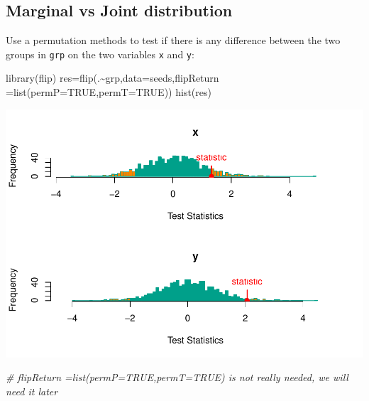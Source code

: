 \documentclass[
]{article}
\newenvironment{Shaded}{\begin{snugshade}}{\end{snugshade}}
\newcommand{\AttributeTok}[1]{\textcolor[rgb]{0.77,0.63,0.00}{#1}}
\newcommand{\CommentTok}[1]{\textcolor[rgb]{0.56,0.35,0.01}{\textit{#1}}}
\newcommand{\ConstantTok}[1]{\textcolor[rgb]{0.00,0.00,0.00}{#1}}
\newcommand{\FunctionTok}[1]{\textcolor[rgb]{0.00,0.00,0.00}{#1}}
\newcommand{\NormalTok}[1]{#1}
\newcommand{\OtherTok}[1]{\textcolor[rgb]{0.56,0.35,0.01}{#1}}
\newcommand{\SpecialCharTok}[1]{\textcolor[rgb]{0.00,0.00,0.00}{#1}}
\begin{document}
\hypertarget{marginal-vs-joint-distribution}{%
\subsection{Marginal vs Joint
distribution}\label{marginal-vs-joint-distribution}}

Use a permutation methods to test if there is any difference between the
two groups in \texttt{grp} on the two variables \texttt{x} and
\texttt{y}:

\begin{Shaded}
\begin{Highlighting}[]
\FunctionTok{library}\NormalTok{(flip)}
\NormalTok{res}\OtherTok{=}\FunctionTok{flip}\NormalTok{(.}\SpecialCharTok{\textasciitilde{}}\NormalTok{grp,}\AttributeTok{data=}\NormalTok{seeds,}\AttributeTok{flipReturn =}\FunctionTok{list}\NormalTok{(}\AttributeTok{permP=}\ConstantTok{TRUE}\NormalTok{,}\AttributeTok{permT=}\ConstantTok{TRUE}\NormalTok{))}
\FunctionTok{hist}\NormalTok{(res)}
\end{Highlighting}
\end{Shaded}

\begin{center}\includegraphics{perm_files/figure-latex/unnamed-chunk-36-1} \end{center}

\begin{Shaded}
\begin{Highlighting}[]
\CommentTok{\# flipReturn =list(permP=TRUE,permT=TRUE) is not really needed, we will need it later}
\end{Highlighting}
\end{Shaded}
\end{document}
